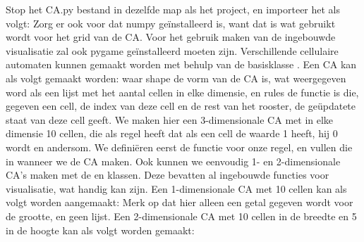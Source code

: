 \markdownRendererDocumentBegin
{}\markdownRendererInterblockSeparator
{}Stop het CA.py bestand in dezelfde map als het project, en importeer het als volgt:\markdownRendererInterblockSeparator
{}\markdownRendererInterblockSeparator
{}Zorg er ook voor dat numpy geïnstalleerd is, want dat is wat gebruikt wordt voor het grid van de CA. Voor het gebruik maken van de ingebouwde visualisatie zal ook pygame geïnstalleerd moeten zijn.\markdownRendererInterblockSeparator
{}\markdownRendererInterblockSeparator
{}Verschillende cellulaire automaten kunnen gemaakt worden met behulp van de basisklasse . Een CA kan als volgt gemaakt worden:\markdownRendererInterblockSeparator
{}\markdownRendererInterblockSeparator
{}waar shape de vorm van de CA is, wat weergegeven word als een lijst met het aantal cellen in elke dimensie, en rules de functie is die, gegeven een cell, de index van deze cell en de rest van het rooster, de geüpdatete staat van deze cell geeft.\markdownRendererInterblockSeparator
{}\markdownRendererInterblockSeparator
{}We maken hier een 3-dimensionale CA met in elke dimensie 10 cellen, die als regel heeft dat als een cell de waarde 1 heeft, hij 0 wordt en andersom.\markdownRendererInterblockSeparator
{}We definiëren eerst de functie voor onze regel, en vullen die in wanneer we de CA maken.\markdownRendererInterblockSeparator
{}\markdownRendererInterblockSeparator
{}\markdownRendererInterblockSeparator
{}Ook kunnen we eenvoudig 1- en 2-dimensionale CA's maken met de  en  klassen. Deze bevatten al ingebouwde functies voor visualisatie, wat handig kan zijn.\markdownRendererInterblockSeparator
{}Een 1-dimensionale CA met 10 cellen kan als volgt worden aangemaakt:\markdownRendererInterblockSeparator
{}\markdownRendererInterblockSeparator
{}Merk op dat hier alleen een getal gegeven wordt voor de grootte, en geen lijst.\markdownRendererInterblockSeparator
{}Een 2-dimensionale CA met 10 cellen in de breedte en 5 in de hoogte kan als volgt worden gemaakt:\markdownRendererInterblockSeparator

